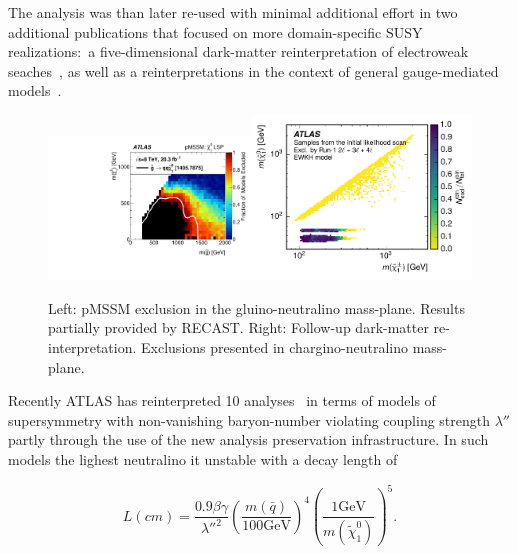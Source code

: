 The analysis was than later re-used with minimal additional effort in two additional publications that focused on more domain-specific SUSY realizations:~a five-dimensional dark-matter reinterpretation of electroweak seaches~\cite{Aaboud:2016wna}, as well as a reinterpretations in the context of general gauge-mediated models~\cite{ATLAS-CONF-2016-033}.

\begin{figure}[t]
\begin{center}
\includegraphics[width=0.48\textwidth,angle=0]{ch5-figures/pMSSM.pdf}\includegraphics[width=0.52\textwidth,angle=0]{ch5-figures/DM.pdf}

\end{center}
\caption{
Left: pMSSM exclusion in the gluino-neutralino mass-plane. Results partially provided by RECAST.
Right: Follow-up dark-matter re-interpretation. Exclusions presented in chargino-neutralino mass-plane.
}
\label{fig:recast-cc}
\end{figure}



Recently ATLAS has reinterpreted 10 analyses~\cite{ATLAS:2018yey} in terms of models of supersymmetry with non-vanishing baryon-number violating coupling strength $\lambda''$ partly through the use of the new analysis preservation infrastructure. In such models the lighest neutralino it unstable with a decay length of

\begin{equation}
  L(cm) = \frac{0.9\beta\gamma}{{\lambda''}^2} \left(\frac{m(\bar{q})}{100\mathrm{GeV}}\right)^4\left(\frac{1\mathrm{GeV}}{m(\tilde{\chi}_1^0)}\right)^5.
\end{equation}

